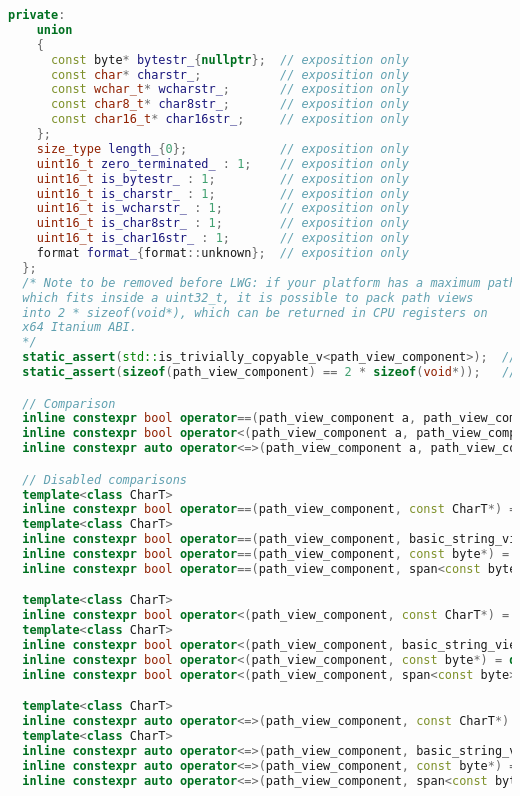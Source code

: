 \documentclass[11pt]{article}
\begin{document}
\begin{lstlisting}[language=cpp]
  private:
    union
    {
      const byte* bytestr_{nullptr};  // exposition only
      const char* charstr_;           // exposition only
      const wchar_t* wcharstr_;       // exposition only
      const char8_t* char8str_;       // exposition only
      const char16_t* char16str_;     // exposition only
    };
    size_type length_{0};             // exposition only
    uint16_t zero_terminated_ : 1;    // exposition only
    uint16_t is_bytestr_ : 1;         // exposition only
    uint16_t is_charstr_ : 1;         // exposition only
    uint16_t is_wcharstr_ : 1;        // exposition only
    uint16_t is_char8str_ : 1;        // exposition only
    uint16_t is_char16str_ : 1;       // exposition only
    format format_{format::unknown};  // exposition only
  };
  /* Note to be removed before LWG: if your platform has a maximum path size
  which fits inside a uint32_t, it is possible to pack path views
  into 2 * sizeof(void*), which can be returned in CPU registers on
  x64 Itanium ABI.
  */
  static_assert(std::is_trivially_copyable_v<path_view_component>);  // to be removed before LWG
  static_assert(sizeof(path_view_component) == 2 * sizeof(void*));   // to be removed before LWG

  // Comparison
  inline constexpr bool operator==(path_view_component a, path_view_component b) noexcept;
  inline constexpr bool operator<(path_view_component a, path_view_component b) noexcept;
  inline constexpr auto operator<=>(path_view_component a, path_view_component b) = default;

  // Disabled comparisons
  template<class CharT>
  inline constexpr bool operator==(path_view_component, const CharT*) = delete;
  template<class CharT>
  inline constexpr bool operator==(path_view_component, basic_string_view<CharT>) = delete;
  inline constexpr bool operator==(path_view_component, const byte*) = delete;
  inline constexpr bool operator==(path_view_component, span<const byte>) = delete;

  template<class CharT>
  inline constexpr bool operator<(path_view_component, const CharT*) = delete;
  template<class CharT>
  inline constexpr bool operator<(path_view_component, basic_string_view<CharT>) = delete;
  inline constexpr bool operator<(path_view_component, const byte*) = delete;
  inline constexpr bool operator<(path_view_component, span<const byte>) = delete;

  template<class CharT>
  inline constexpr auto operator<=>(path_view_component, const CharT*) = delete;
  template<class CharT>
  inline constexpr auto operator<=>(path_view_component, basic_string_view<CharT>) = delete;
  inline constexpr auto operator<=>(path_view_component, const byte*) = delete;
  inline constexpr auto operator<=>(path_view_component, span<const byte>) = delete;


\end{lstlisting}
\end{document}
